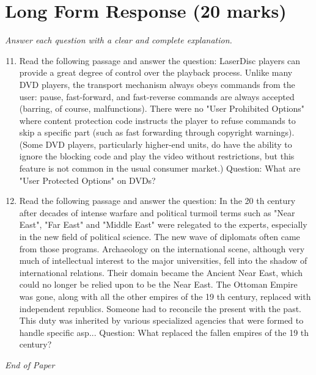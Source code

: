 \documentclass[12pt]{article}
\begin{document}
\section*{Long Form Response (20 marks)}
\textit{Answer each question with a clear and complete explanation.}
\begin{enumerate}[label=\arabic*.]
\setcounter{enumi}{10}
\item Read the following passage and answer the question: LaserDisc players can provide a great degree of control over the playback process. Unlike many DVD players, the transport mechanism always obeys commands from the user: pause, fast-forward, and fast-reverse commands are always accepted (barring, of course, malfunctions). There were no "User Prohibited Options" where content protection code instructs the player to refuse commands to skip a specific part (such as fast forwarding through copyright warnings). (Some DVD players, particularly higher-end units, do have the ability to ignore the blocking code and play the video without restrictions, but this feature is not common in the usual consumer market.) Question: What are "User Protected Options" on DVDs?
\item Read the following passage and answer the question: In the 20 th century after decades of intense warfare and political turmoil terms such as "Near East", "Far East" and "Middle East" were relegated to the experts, especially in the new field of political science. The new wave of diplomats often came from those programs. Archaeology on the international scene, although very much of intellectual interest to the major universities, fell into the shadow of international relations. Their domain became the Ancient Near East, which could no longer be relied upon to be the Near East. The Ottoman Empire was gone, along with all the other empires of the 19 th century, replaced with independent republics. Someone had to reconcile the present with the past. This duty was inherited by various specialized agencies that were formed to handle specific asp... Question: What replaced the fallen empires of the 19 th century?
\end{enumerate}

\vfill
\noindent\textit{End of Paper}
\end{document}
